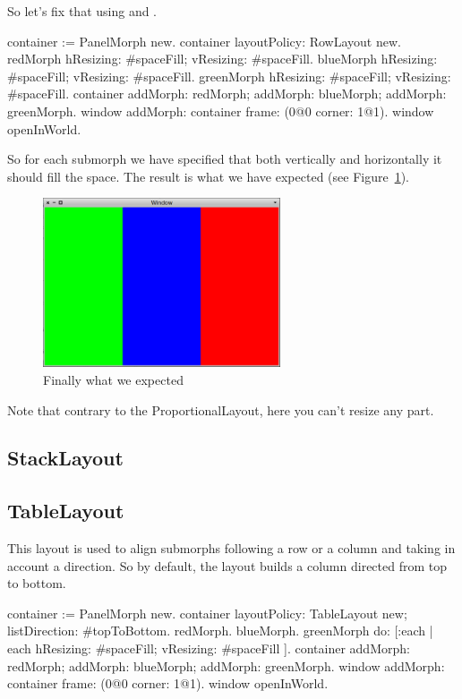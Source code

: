 \documentclass[a4paper,10pt,twoside]{book}
\begin{document}
So let's fix that using  and . 

\begin{code}{}
container := PanelMorph new.
container layoutPolicy: RowLayout new.
redMorph
	hResizing: #spaceFill;
	vResizing: #spaceFill.
blueMorph
	hResizing: #spaceFill;
	vResizing: #spaceFill.
greenMorph
	hResizing: #spaceFill;
	vResizing: #spaceFill.
container 
	addMorph: redMorph;
	addMorph: blueMorph;
	addMorph: greenMorph.
window
	addMorph: container
	frame: (0@0 corner: 1@1).
window openInWorld.
\end{code}

So for each submorph we have specified that both vertically and horizontally it should fill the space.
The result is what we have expected (see Figure~\ref{fig:rowLayout3}).

\begin{figure}[ht]\centering
	\includegraphics[width=7cm]{RowLayout3}
	\caption{Finally what we expected}
	\label{fig:rowLayout3}
\end{figure}

Note that contrary to the ProportionalLayout, here you can't resize any part.

\subsection{StackLayout}


\subsection{TableLayout}
This layout is used to align submorphs following a row or a column and taking in account a direction.
So by default, the layout builds a column directed from top to bottom.
\begin{code}{}
container := PanelMorph new.
container 
	layoutPolicy: TableLayout new;
	listDirection: #topToBottom.
{ redMorph. blueMorph. greenMorph } do: [:each |
	each 
		hResizing: #spaceFill;
		vResizing: #spaceFill ].
container 
	addMorph: redMorph;
	addMorph: blueMorph;
	addMorph: greenMorph.
window
	addMorph: container
	frame: (0@0 corner: 1@1).
window openInWorld.
\end{code}
\end{document}
